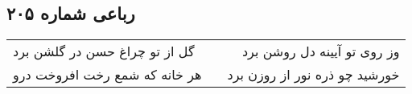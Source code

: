 \begin{center}
\section*{رباعی شماره ۲۰۵}
\label{sec:sh205}
\begin{longtable}{l p{0.5cm} r}
گل از تو چراغ حسن در گلشن برد
&&
وز روی تو آیینه دل روشن برد
\\
هر خانه که شمع رخت افروخت درو
&&
خورشید چو ذره نور از روزن برد
\\
\end{longtable}
\end{center}
